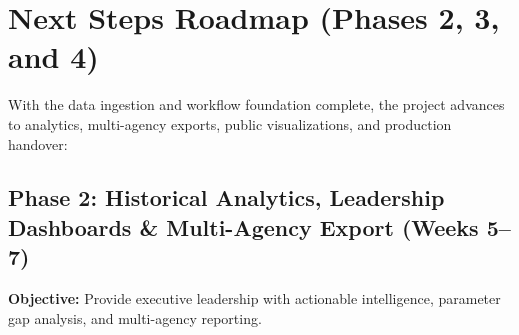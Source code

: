 \documentclass[11pt,a4paper]{article}
\begin{document}
\vspace{-0.2cm}

\section{Next Steps Roadmap (Phases 2, 3, and 4)}

With the data ingestion and workflow foundation complete, the project advances to analytics, multi-agency exports, public visualizations, and production handover:

\subsection{Phase 2: Historical Analytics, Leadership Dashboards \& Multi-Agency Export (Weeks 5--7)}
\textbf{Objective:} Provide executive leadership with actionable intelligence, parameter gap analysis, and multi-agency reporting.
\end{document}
